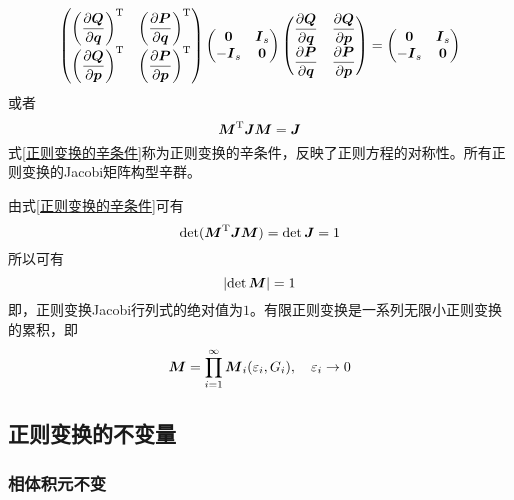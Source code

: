 \begin{equation*}
	\begin{pmatrix} \left(\dfrac{\partial \boldsymbol{Q}}{\partial \boldsymbol{q}}\right)^{\mathrm{T}} & \left(\dfrac{\partial \boldsymbol{P}}{\partial \boldsymbol{q}}\right)^{\mathrm{T}} \\[1.5ex] \left(\dfrac{\partial \boldsymbol{Q}}{\partial \boldsymbol{p}}\right)^{\mathrm{T}} & \left(\dfrac{\partial \boldsymbol{P}}{\partial \boldsymbol{p}}\right)^{\mathrm{T}} \end{pmatrix} \begin{pmatrix} \boldsymbol{0} & \boldsymbol{I}_s \\ -\boldsymbol{I}_s & \boldsymbol{0} \end{pmatrix} \begin{pmatrix} \dfrac{\partial \boldsymbol{Q}}{\partial \boldsymbol{q}} & \dfrac{\partial \boldsymbol{Q}}{\partial \boldsymbol{p}} \\[1.5ex] \dfrac{\partial \boldsymbol{P}}{\partial \boldsymbol{q}} & \dfrac{\partial \boldsymbol{P}}{\partial \boldsymbol{p}} \end{pmatrix} = \begin{pmatrix} \boldsymbol{0} & \boldsymbol{I}_s \\ -\boldsymbol{I}_s & \boldsymbol{0} \end{pmatrix}
\end{equation*}
或者
\begin{equation}
	\boldsymbol{M}^{\mathrm{T}} \boldsymbol{J} \boldsymbol{M} = \boldsymbol{J}
	\label{正则变换的辛条件}
\end{equation}
式\eqref{正则变换的辛条件}称为{\heiti 正则变换的辛条件}，反映了正则方程的对称性。所有正则变换的Jacobi矩阵构型{\heiti 辛群}。

由式\eqref{正则变换的辛条件}可有
\begin{equation*}
	\det(\boldsymbol{M}^{\mathrm{T}} \boldsymbol{J} \boldsymbol{M}) = \det \boldsymbol{J} = 1
\end{equation*}
所以可有
\begin{equation}
	\left|\det \boldsymbol{M}\right| = 1
\end{equation}
即，正则变换Jacobi行列式的绝对值为$1$。有限正则变换是一系列无限小正则变换的累积，即
\begin{equation*}
	\boldsymbol{M} = \prod_{i=1}^\infty \boldsymbol{M}_i(\varepsilon_i,G_i),\quad \varepsilon_i \to 0
\end{equation*}

\subsection{正则变换的不变量}

\subsubsection{相体积元不变}

